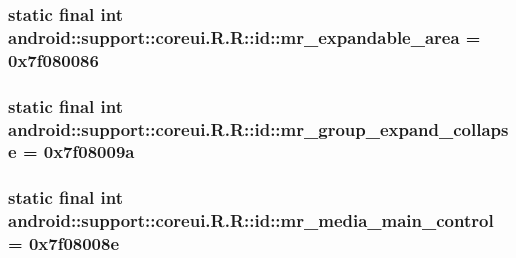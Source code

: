 \hypertarget{classandroid_1_1support_1_1coreui_1_1_r_1_1id_3577a5163db139354d00be534bde498f}{
\subsubsection[{mr\_\-expandable\_\-area}]{\setlength{\rightskip}{0pt plus 5cm}static final int android::support::coreui.R.R::id::mr\_\-expandable\_\-area = 0x7f080086}}
\label{classandroid_1_1support_1_1coreui_1_1_r_1_1id_3577a5163db139354d00be534bde498f}


\hypertarget{classandroid_1_1support_1_1coreui_1_1_r_1_1id_acc5debd98a1977a06101b44751a9309}{
\subsubsection[{mr\_\-group\_\-expand\_\-collapse}]{\setlength{\rightskip}{0pt plus 5cm}static final int android::support::coreui.R.R::id::mr\_\-group\_\-expand\_\-collapse = 0x7f08009a}}
\label{classandroid_1_1support_1_1coreui_1_1_r_1_1id_acc5debd98a1977a06101b44751a9309}


\hypertarget{classandroid_1_1support_1_1coreui_1_1_r_1_1id_7a3f30efa36a3d87b333b164681fb9b7}{
\subsubsection[{mr\_\-media\_\-main\_\-control}]{\setlength{\rightskip}{0pt plus 5cm}static final int android::support::coreui.R.R::id::mr\_\-media\_\-main\_\-control = 0x7f08008e}}
\label{classandroid_1_1support_1_1coreui_1_1_r_1_1id_7a3f30efa36a3d87b333b164681fb9b7}


